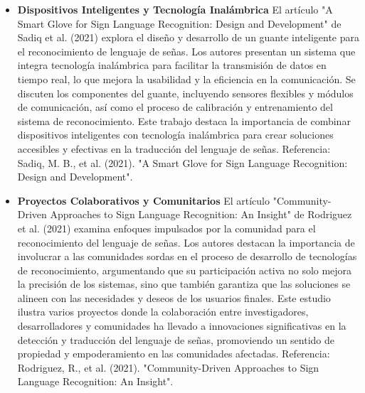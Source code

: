 \begin{itemize}
\item \textbf{Dispositivos Inteligentes y Tecnología Inalámbrica} \newline 
El artículo "A Smart Glove for Sign Language Recognition: Design and Development" de Sadiq et al. (2021) explora el diseño y desarrollo de un guante inteligente para el reconocimiento de lenguaje de señas. Los autores presentan un sistema que integra tecnología inalámbrica para facilitar la transmisión de datos en tiempo real, lo que mejora la usabilidad y la eficiencia en la comunicación. Se discuten los componentes del guante, incluyendo sensores flexibles y módulos de comunicación, así como el proceso de calibración y entrenamiento del sistema de reconocimiento. Este trabajo destaca la importancia de combinar dispositivos inteligentes con tecnología inalámbrica para crear soluciones accesibles y efectivas en la traducción del lenguaje de señas.  \newline 
Referencia: Sadiq, M. B., et al. (2021). "A Smart Glove for Sign Language Recognition: Design and Development". \cite{sciencedirect_s0957417421003214}

\item \textbf{Proyectos Colaborativos y Comunitarios} \newline 
El artículo "Community-Driven Approaches to Sign Language Recognition: An Insight" de Rodriguez et al. (2021) examina enfoques impulsados por la comunidad para el reconocimiento del lenguaje de señas. Los autores destacan la importancia de involucrar a las comunidades sordas en el proceso de desarrollo de tecnologías de reconocimiento, argumentando que su participación activa no solo mejora la precisión de los sistemas, sino que también garantiza que las soluciones se alineen con las necesidades y deseos de los usuarios finales. Este estudio ilustra varios proyectos donde la colaboración entre investigadores, desarrolladores y comunidades ha llevado a innovaciones significativas en la detección y traducción del lenguaje de señas, promoviendo un sentido de propiedad y empoderamiento en las comunidades afectadas. \newline  
Referencia: Rodriguez, R., et al. (2021). "Community-Driven Approaches to Sign Language Recognition: An Insight". \cite{journaloflanguageandlinguisticstudies}

\end{itemize}
